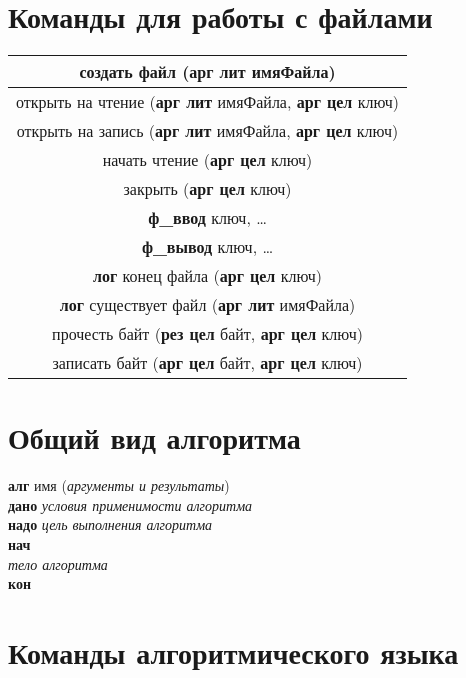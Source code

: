 \section{Команды для работы с файлами}
\begin{center}
\begin{tabular}{||c||}
\hline
\hline
создать файл (\textbf{арг лит} имяФайла)\\
\hline
  открыть на чтение (\textbf{арг лит} имяФайла, \textbf{арг цел} ключ)\\
\hline
  открыть на запись (\textbf{арг лит} имяФайла, \textbf{арг цел} ключ)\\
\hline
  начать чтение (\textbf{арг цел} ключ)\\
\hline
  закрыть (\textbf{арг цел} ключ)\\
\hline
  \textbf{ф\_ввод} ключ, \dots\\
\hline
  \textbf{ф\_вывод} ключ, \dots\\
\hline
  \textbf{лог} конец файла (\textbf{арг цел} ключ)\\
\hline
  \textbf{лог} существует файл (\textbf{арг лит} имяФайла)\\
\hline
прочесть байт (\textbf{рез цел} байт, \textbf{арг цел} ключ)\\
\hline
записать байт (\textbf{арг цел} байт, \textbf{арг цел} ключ)\\
\hline
\hline
\end{tabular}
\end{center}

\section{Общий вид алгоритма}
\sffamily
\textbf{алг} имя (\emph{аргументы и результаты})\\ 
\otstup \textbf{дано} \emph{условия применимости алгоритма}\\
\otstup \textbf{надо} \emph{цель выполнения алгоритма}\\
\textbf{нач}\\
\otstup \emph{тело алгоритма}\\
\textbf{кон}

\section{Команды алгоритмического языка}

